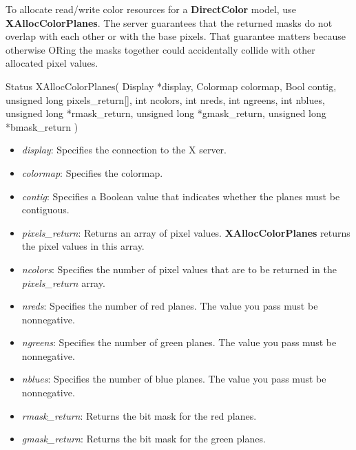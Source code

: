 \documentclass{report}
\begin{document}
\begin{itemize}
            \bigbreak \noindent
            To allocate read/write color resources for a \textbf{DirectColor} model, use \textbf{XAllocColorPlanes}.
            \bigbreak \noindent 
            The server guarantees that the returned masks do not overlap with each other or with the base pixels. That guarantee matters because otherwise ORing the masks together could accidentally collide with other allocated pixel values.
            \bigbreak \noindent 
            \begin{cppcode}
                Status XAllocColorPlanes(
                    Display *display,
                    Colormap colormap,
                    Bool contig,
                    unsigned long pixels_return[],
                    int ncolors,
                    int nreds,
                    int ngreens,
                    int nblues,
                    unsigned long *rmask_return,
                    unsigned long *gmask_return,
                    unsigned long *bmask_return
                )
            \end{cppcode}
            \begin{itemize}
                \item \textit{display}: Specifies the connection to the X server.
                \item \textit{colormap}: Specifies the colormap.
                \item \textit{contig}: Specifies a Boolean value that indicates whether the planes must be contiguous.
                \item \textit{pixels\_return}: Returns an array of pixel values. \textbf{XAllocColorPlanes} returns the pixel values in this array.
                \item \textit{ncolors}: Specifies the number of pixel values that are to be returned in the \textit{pixels\_return} array.
                \item \textit{nreds}: Specifies the number of red planes. The value you pass must be nonnegative.
                \item \textit{ngreens}: Specifies the number of green planes. The value you pass must be nonnegative.
                \item \textit{nblues}: Specifies the number of blue planes. The value you pass must be nonnegative.
                \item \textit{rmask\_return}: Returns the bit mask for the red planes.
                \item \textit{gmask\_return}: Returns the bit mask for the green planes.

\end{itemize}
\end{itemize}
\end{document}
